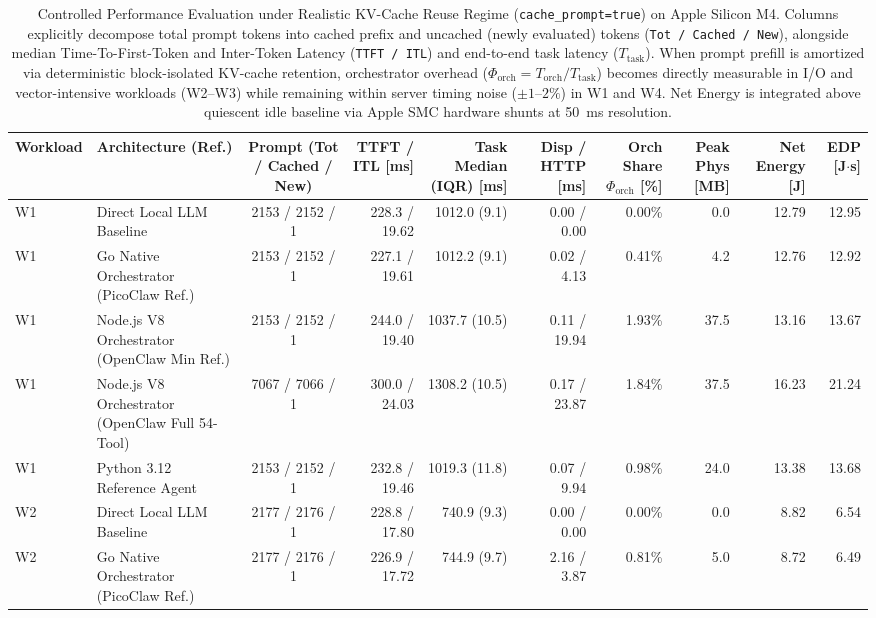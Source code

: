\begin{table}[t]
\centering
\caption{Controlled Performance Evaluation under Realistic KV-Cache Reuse Regime (\texttt{cache\_prompt=true}) on Apple Silicon M4. Columns explicitly decompose total prompt tokens into cached prefix and uncached (newly evaluated) tokens (\texttt{Tot / Cached / New}), alongside median Time-To-First-Token and Inter-Token Latency (\texttt{TTFT / ITL}) and end-to-end task latency ($T_{\text{task}}$). When prompt prefill is amortized via deterministic block-isolated KV-cache retention, orchestrator overhead ($\Phi_{\text{orch}} = T_{\text{orch}} / T_{\text{task}}$) becomes directly measurable in I/O and vector-intensive workloads (W2--W3) while remaining within server timing noise ($\pm 1\text{--}2\%$) in W1 and W4. Net Energy is integrated above quiescent idle baseline via Apple SMC hardware shunts at 50~ms resolution.}
\label{tab:evaluation_warm_cache_m4}
\scriptsize
\setlength{\tabcolsep}{3.5pt}
\begin{tabular}{l l c r r r r r r r}
\hline
\textbf{Workload} & \textbf{Architecture (Ref.)} & \textbf{Prompt (Tot / Cached / New)} & \textbf{TTFT / ITL [ms]} & \textbf{Task Median (IQR) [ms]} & \textbf{Disp / HTTP [ms]} & \textbf{Orch Share $\Phi_{\text{orch}}$ [\%]} & \textbf{Peak Phys [MB]} & \textbf{Net Energy [J]} & \textbf{EDP [J$\cdot$s]} \\
\hline
W1 & Direct Local LLM Baseline & 2153 / 2152 / 1 & 228.3 / 19.62 & 1012.0 (9.1) & 0.00 / 0.00 & 0.00\% & 0.0 & 12.79 & 12.95 \\
W1 & Go Native Orchestrator (PicoClaw Ref.) & 2153 / 2152 / 1 & 227.1 / 19.61 & 1012.2 (9.1) & 0.02 / 4.13 & 0.41\% & 4.2 & 12.76 & 12.92 \\
W1 & Node.js V8 Orchestrator (OpenClaw Min Ref.) & 2153 / 2152 / 1 & 244.0 / 19.40 & 1037.7 (10.5) & 0.11 / 19.94 & 1.93\% & 37.5 & 13.16 & 13.67 \\
W1 & Node.js V8 Orchestrator (OpenClaw Full 54-Tool) & 7067 / 7066 / 1 & 300.0 / 24.03 & 1308.2 (10.5) & 0.17 / 23.87 & 1.84\% & 37.5 & 16.23 & 21.24 \\
W1 & Python 3.12 Reference Agent & 2153 / 2152 / 1 & 232.8 / 19.46 & 1019.3 (11.8) & 0.07 / 9.94 & 0.98\% & 24.0 & 13.38 & 13.68 \\
\hline
W2 & Direct Local LLM Baseline & 2177 / 2176 / 1 & 228.8 / 17.80 & 740.9 (9.3) & 0.00 / 0.00 & 0.00\% & 0.0 & 8.82 & 6.54 \\
W2 & Go Native Orchestrator (PicoClaw Ref.) & 2177 / 2176 / 1 & 226.9 / 17.72 & 744.9 (9.7) & 2.16 / 3.87 & 0.81\% & 5.0 & 8.72 & 6.49 \\

\end{tabular}
\end{table}
